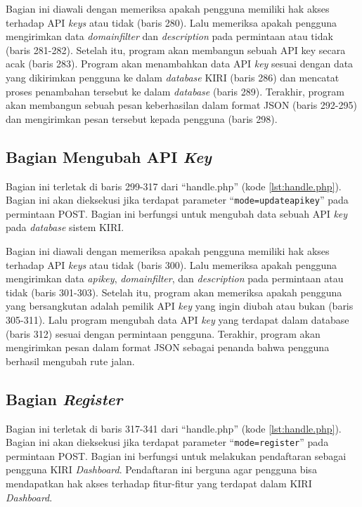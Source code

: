 Bagian ini diawali dengan memeriksa apakah pengguna memiliki hak akses terhadap API \textit{keys} atau tidak (baris 280). Lalu memeriksa apakah pengguna mengirimkan data \textit{domainfilter} dan \textit{description} pada permintaan atau tidak (baris 281-282). Setelah itu, program akan membangun sebuah API key secara acak (baris 283). Program akan menambahkan data API \textit{key} sesuai dengan data yang dikirimkan pengguna ke dalam \textit{database} KIRI (baris 286) dan mencatat proses penambahan tersebut ke dalam \textit{database} (baris 289). Terakhir, program akan membangun sebuah pesan keberhasilan dalam format JSON (baris 292-295) dan mengirimkan pesan tersebut kepada pengguna (baris 298).

\subsection{Bagian Mengubah API \textit{Key}}
\label{sec:ubahapikey}
Bagian ini terletak di baris 299-317 dari ``handle.php'' (kode \ref{lst:handle.php}). Bagian ini akan dieksekusi jika terdapat parameter ``\texttt{mode=updateapikey}'' pada permintaan POST. Bagian ini berfungsi untuk mengubah data sebuah API \textit{key} pada \textit{database} sistem KIRI.

Bagian ini diawali dengan memeriksa apakah pengguna memiliki hak akses terhadap API \textit{keys} atau tidak (baris 300). Lalu memeriksa apakah pengguna mengirimkan data \textit{apikey}, \textit{domainfilter}, dan \textit{description} pada permintaan atau tidak (baris 301-303). Setelah itu, program akan memeriksa apakah pengguna yang bersangkutan adalah pemilik API \textit{key} yang ingin diubah atau bukan (baris 305-311). Lalu program mengubah data API \textit{key} yang terdapat dalam database (baris 312) sesuai dengan permintaan pengguna. Terakhir, program akan mengirimkan pesan dalam format JSON sebagai penanda bahwa pengguna berhasil mengubah rute jalan.

\subsection{Bagian \textit{Register}}
\label{sec:bagianregister}
Bagian ini terletak di baris 317-341 dari ``handle.php'' (kode \ref{lst:handle.php}). Bagian ini akan dieksekusi jika terdapat parameter ``\texttt{mode=register}'' pada permintaan POST. Bagian ini berfungsi untuk melakukan pendaftaran sebagai pengguna KIRI \textit{Dashboard}. Pendaftaran ini berguna agar pengguna bisa mendapatkan hak akses terhadap fitur-fitur yang terdapat dalam KIRI \textit{Dashboard}.

